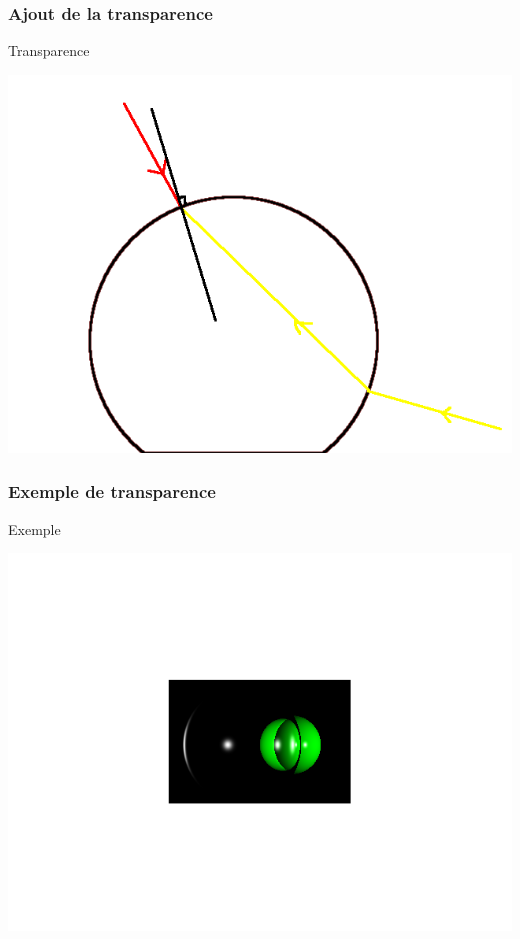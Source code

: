 \begin{frame}
	\frametitle{Ajout de la transparence}
	\begin{block}{Transparence}
	\begin{center}
		\includegraphics[scale=0.35]{transparence.png}
	\end{center} 
	\end{block}
\end{frame}

\begin{frame}
	\frametitle{Exemple de transparence}
	\begin{block}{Exemple}
	\begin{center}
			\includegraphics[scale=0.35]{Untitled.png} 
	\end{center}
	\end{block}
\end{frame}
